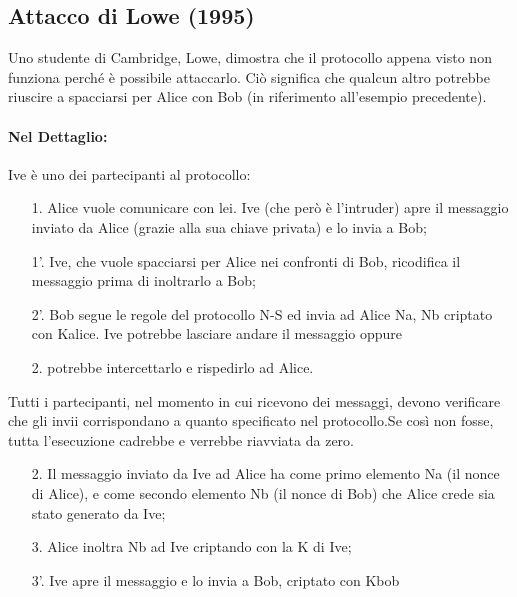 \subsection{Attacco di Lowe (1995)}

Uno studente di Cambridge, Lowe, dimostra che il protocollo appena visto non funziona perché è
possibile attaccarlo. Ciò significa che qualcun altro potrebbe riuscire a spacciarsi per Alice con Bob
(in riferimento all’esempio precedente).

\paragraph{Nel Dettaglio: }
Ive è uno dei partecipanti al protocollo:

\begin{enumerate}
    \item[1.]  Alice vuole comunicare con lei. Ive (che però è l’intruder)
        apre il messaggio inviato da Alice
        (grazie alla sua chiave privata) e lo invia a Bob;
    \item[1'.] Ive, che vuole spacciarsi per Alice nei confronti di Bob,
        ricodifica il messaggio prima di inoltrarlo
        a Bob;
    \item[2'.] Bob segue le regole del protocollo N-S ed invia ad Alice
            {Na, Nb} criptato con Kalice. Ive
        potrebbe lasciare andare il messaggio oppure
    \item[2.] potrebbe intercettarlo e rispedirlo ad Alice.
\end{enumerate}
Tutti i partecipanti, nel momento in cui ricevono dei messaggi, devono
verificare che gli invii
corrispondano a quanto specificato nel protocollo.Se così non fosse, tutta
l’esecuzione cadrebbe e
verrebbe riavviata da zero.

\begin{enumerate}
    \item[2.] Il messaggio inviato da Ive ad Alice ha come primo
        elemento Na (il nonce di Alice), e come secondo elemento Nb
        (il nonce di Bob) che Alice crede sia stato
        generato da Ive;
    \item[3.] Alice inoltra Nb ad Ive criptando con la K di Ive;
    \item[3'.] Ive apre il messaggio e lo invia a Bob, criptato con Kbob
\end{enumerate}

